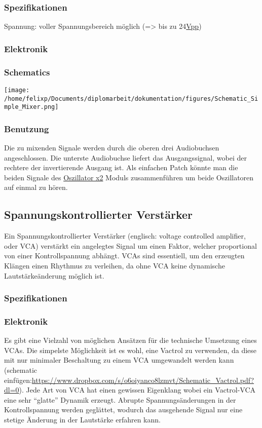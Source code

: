 \subsubsection{Spezifikationen}
\label{sec:orgcc000f8}
Spannung: voller Spannungsbereich möglich (=> bis zu 24\href{file:///home/felixp/Documents/diplomarbeit/dokumentation/content/hauptteil.org}{Vpp})
\subsubsection{Elektronik}
\label{sec:orgbcddcd4}
\subsubsection{Schematics}
\label{sec:org444d5ed}
\begin{center}
\texttt{[image: /home/felixp/Documents/diplomarbeit/dokumentation/figures/Schematic\_Simple\_Mixer.png]}
\end{center}
\subsubsection{Benutzung}
\label{sec:org5900d0e}
Die zu mixenden Signale werden durch die oberen drei Audiobuchsen angeschlossen. Die unterste Audiobuchse liefert das Ausgangssignal, wobei der rechtere der invertierende Ausgang ist. Als einfachen Patch könnte man die beiden Signale des \href{modules/oscillator.org}{Oszillator x2} Moduls zusammenführen um beide Oszillatoren auf einmal zu hören.

\subsection{Spannungskontrollierter Verstärker}
\label{sec:org96ec329}
Ein Spannungskontrollierter Verstärker (englisch: voltage controlled amplifier, oder VCA) verstärkt ein angelegtes Signal um einen Faktor, welcher proportional von einer Kontrollspannung abhängt. VCAs sind essentiell, um den erzeugten Klängen einen Rhythmus zu verleihen, da ohne VCA keine dynamische Lautstärkeänderung möglich ist. 
\subsubsection{Spezifikationen}
\label{sec:org78f4ad4}
\subsubsection{Elektronik}
\label{sec:org64eedb8}
Es gibt eine Vielzahl von möglichen Ansätzen für die technische Umsetzung eines VCAs. Die simpelste Möglichkeit ist es wohl, eine Vactrol zu verwenden, da diese mit nur minimaler Beschaltung zu einem VCA umgewandelt werden kann (schematic einfügen:\url{https://www.dropbox.com/s/o6oiyanco8lzmvt/Schematic\_Vactrol.pdf?dl=0}). Jede Art von VCA hat einen gewissen Eigenklang wobei ein Vactrol-VCA eine sehr "`glatte"' Dynamik erzeugt. Abrupte Spannungsänderungen in der Kontrollspannung werden geglättet, wodurch das ausgehende Signal nur eine stetige Änderung in der Lautstärke erfahren kann.

